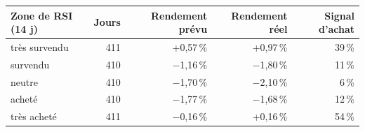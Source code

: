 \begin{tabular}{lrrrr}\toprule
Zone de RSI (14 j) & Jours & Rendement prévu & Rendement réel & Signal d'achat \\\midrule
très survendu & 411 & +0,57\,\% & +0,97\,\% & 39\,\% \\
survendu & 410 & $-$1,16\,\% & $-$1,80\,\% & 11\,\% \\
neutre & 410 & $-$1,70\,\% & $-$2,10\,\% & 6\,\% \\
acheté & 410 & $-$1,77\,\% & $-$1,68\,\% & 12\,\% \\
très acheté & 411 & $-$0,16\,\% & +0,16\,\% & 54\,\% \\
\bottomrule\end{tabular}
